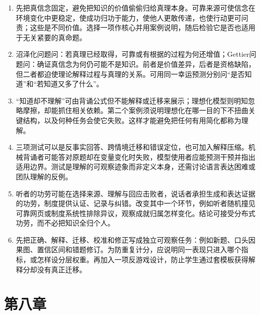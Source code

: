 \begin{enumerate}
\item 先把真信念固定，避免把知识的价值偷偷归给真理本身。可靠来源可使信念在环境变化中更稳定，使成功归功于能力，使他人更敢传递，也使行动更可问责；这些是不同价值。选择一项作核心并用案例说明，随后检验它是否也适用于无关紧要的真命题。
\item 沼泽化问题问：若真理已经取得，可靠或有根据的过程为何还增值；Gettier问题问：确证真信念为何仍可能不是知识。前者是价值差异，后者是资格缺陷，但二者都迫使理论解释过程与真理的关系。可用同一幸运预测分别问“是否知道”和“若知道又多了什么”。
\item “知道却不理解”可由背诵公式但不能解释或迁移来展示；理想化模型则明知忽略摩擦，却能抓住相关依赖。第二个案例须说明理想化在哪一目的下不扭曲关键结构，以及何种任务会使它失败。这样才能避免把任何有用简化都称为理解。
\item 三项测试可以是反事实回答、跨情境迁移和错误定位，也可加入解释压缩。机械背诵者可能答对原题却在变量变化时失败，模型使用者应能预测干预并指出适用边界。测试是理解的可观察迹象而非定义本身，还需讨论语言表达困难或团队理解的反例。
\item 听者的功劳可能在选择来源、理解与回应击败者，说话者承担生成和表达证据的功劳，制度提供认证、记录与纠错。改变其中一个环节，例如听者随机撞见可靠网页或制度系统性排除异议，观察成就归属怎样变化。结论可接受分布式功劳，而不必把知识全归个人。
\item 先把正确、解释、迁移、校准和修正写成独立可观察任务：例如新题、口头因果图、置信区间和错题修订。为防重复计分，应说明同一表现只进入哪个指标，或怎样设分层权重。再加入一项反游戏设计，防止学生通过套模板获得解释分却没有真正迁移。
\end{enumerate}

\section*{第八章}

